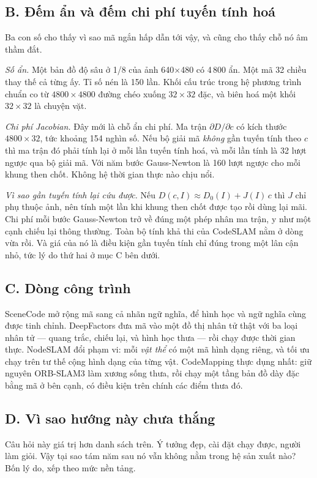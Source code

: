 \documentclass[../../deep_learning.tex]{subfiles}
\begin{document}
\subsection{B. Đếm ẩn và đếm chi phí tuyến tính hoá}
Ba con số cho thấy vì sao mã ngắn hấp dẫn tới vậy, và cũng cho thấy chỗ nó âm thầm đắt.

\emph{Số ẩn.} Một bản đồ độ sâu ở 1/8 của ảnh 640\(\times\)480 có 4\,800 ẩn. Một mã 32 chiều thay thế cả từng ấy. Tỉ số nén là 150 lần. Khối cấu trúc trong hệ phương trình chuẩn co từ \(4800\times4800\) đường chéo xuống \(32\times32\) đặc, và biên hoá một khối \(32\times32\) là chuyện vặt.

\emph{Chi phí Jacobian.} Đây mới là chỗ ẩn chi phí. Ma trận \(\partial D/\partial c\) có kích thước \(4800\times32\), tức khoảng 154 nghìn số. Nếu bộ giải mã \emph{không} gần tuyến tính theo \(c\) thì ma trận đó phải tính lại ở mỗi lần tuyến tính hoá, và mỗi lần tính là 32 lượt ngược qua bộ giải mã. Với năm bước Gauss-Newton là 160 lượt ngược cho mỗi khung then chốt. Không hệ thời gian thực nào chịu nổi.

\emph{Vì sao gần tuyến tính lại cứu được.} Nếu \(D(c,I) \approx D_0(I) + J(I)\,c\) thì \(J\) chỉ phụ thuộc ảnh, nên tính một lần khi khung then chốt được tạo rồi dùng lại mãi. Chi phí mỗi bước Gauss-Newton trở về đúng một phép nhân ma trận, y như một cạnh chiếu lại thông thường. Toàn bộ tính khả thi của CodeSLAM nằm ở dòng vừa rồi. Và giá của nó là điều kiện gần tuyến tính chỉ đúng trong một lân cận nhỏ, tức lý do thứ hai ở mục C bên dưới.

\subsection{C. Dòng công trình}
SceneCode \cite{zhi2019scenecode} mở rộng mã sang cả nhãn ngữ nghĩa, để hình học và ngữ nghĩa cùng được tinh chỉnh. DeepFactors \cite{czarnowski2020deepfactors} đưa mã vào một đồ thị nhân tử thật với ba loại nhân tử --- quang trắc, chiếu lại, và hình học thưa --- rồi chạy được thời gian thực. NodeSLAM \cite{sucar2020nodeslam} đổi phạm vi: mỗi \emph{vật thể} có một mã hình dạng riêng, và tối ưu chạy trên tư thế cộng hình dạng của từng vật. CodeMapping \cite{matsuki2021codemapping} thực dụng nhất: giữ nguyên ORB-SLAM3 làm xương sống thưa, rồi chạy một tầng bản đồ dày đặc bằng mã ở bên cạnh, có điều kiện trên chính các điểm thưa đó.

\subsection{D. Vì sao hướng này chưa thắng}
Câu hỏi này giá trị hơn danh sách trên. Ý tưởng đẹp, cài đặt chạy được, người làm giỏi. Vậy tại sao tám năm sau nó vẫn không nằm trong hệ sản xuất nào? Bốn lý do, xếp theo mức nền tảng.
\end{document}
